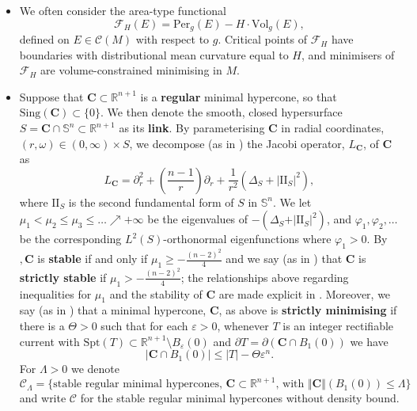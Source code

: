 \documentclass[12pt]{article}
\begin{document}
\begin{itemize}
   
     \item We often consider the area-type functional
     $$\mathcal{F}_H(E) = \mathrm{Per}_g(E) - H \cdot \mathrm{Vol}_g(E),$$
     defined on $E \in \mathcal{C}(M)$ with respect to $g$. Critical points of $\mathcal{F}_H$ have boundaries with distributional mean curvature equal to $H$, and minimisers of $\mathcal{F}_H$ are volume-constrained minimising in $M$.
 
     \item Suppose that $\mathbf{C} \subset \mathbb{R}^{n+1}$ is a \textbf{regular} minimal hypercone, so that $\mathrm{Sing}(\mathbf{C}) \subset \{0\}$. We then denote the smooth, closed hypersurface $S = \mathbf{C} \cap \mathbb{S}^n \subset \mathbb{R}^{n+1}$ as its \textbf{link}. By parameterising $\mathbf{C}$ in radial coordinates, $(r,\omega) \in (0,\infty) \times S$, we decompose (as in \cite{S68}) the Jacobi operator, $L_{\mathbf{C}}$, of $\mathbf{C}$ as
    $$L_{\mathbf{C}} = \partial^2_r + \left(\frac{n-1}{r}\right)\partial_r + \frac{1}{r^2}(\Delta_S + |\mathrm{I\!I}_S|^2),$$
    where $\mathrm{I\!I}_S$ is the second fundamental form of $S$ in $\mathbb{S}^n$. We let $\mu_1 < \mu_2 \leq \mu_3 \leq \ldots \nearrow + \infty$ be the eigenvalues of $- (\Delta_S + \vert \mathrm{I\!I}_S \vert^2)$, and $\varphi_1, \varphi_2, \ldots$ be the corresponding $L^2(S)$-orthonormal eigenfunctions where $\varphi_1 > 0$. By \cite{S68}$, \mathbf{C}$ is \textbf{stable} if and only if $\mu_1\geq -\frac{(n-2)^2}{4}$ and we say (as in \cite{CHS84}) that $\mathbf{C}$ is \textbf{strictly stable} if $\mu_1 > -\frac{(n-2)^2}{4}$; the relationships above regarding inequalities for $\mu_1$ and the stability of $\mathbf{C}$ are made explicit in \cite[Section 4]{CHS84}. Moreover, we say (as in \cite{HS85}) that a minimal hypercone, $\mathbf{C}$, as above is \textbf{strictly minimising} if there is a $\Theta > 0$ such that for each $\varepsilon > 0$, whenever $T$ is an integer rectifiable current with $\mathrm{Spt}(T) \subset \mathbb{R}^{n+1} \setminus B_\varepsilon(0)$ and $\partial T = \partial (\mathbf{C} \cap B_1(0))$ we have
    $$|\mathbf{C} \cap B_1(0)| \leq |T| - \Theta\varepsilon^n.$$
    For $\Lambda > 0$ we denote $$\mathscr{C}_\Lambda = \{\text{stable regular minimal hypercones, $\mathbf{C} \subset \mathbb{R}^{n+1}$, with $\Vert \mathbf{C} \Vert(B_1(0)) \leq \Lambda$}\}$$
    and write $\mathscr{C}$ for the stable regular minimal hypercones without density bound.
    

\end{itemize}
\end{document}
